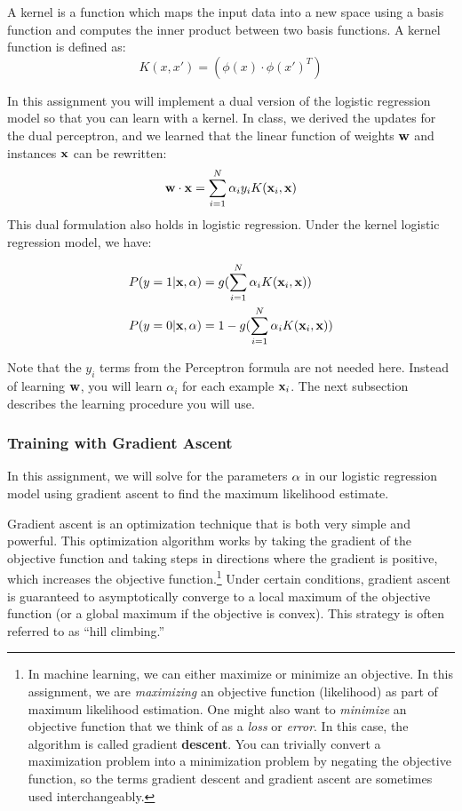 \documentclass[11pt]{article}
\newcommand{\alphai}{\alpha_i}
\newcommand{\vw}{{\bf w}}
\newcommand{\va}{{\bf \alpha}}
\newcommand{\vx}{{\bf x}}
\newcommand{\vxi}{{\bf x}_i}
\newcommand{\yi}{y_i}
\begin{document}
A kernel is a function which maps the input data into a new space using a basis function and computes the inner product between two basis functions. A kernel function is defined as:
\[
K(x, x') = (\phi(x) \cdot \phi(x')^T)
\]

In this assignment you will implement a dual version of the logistic regression model so that you can learn with a kernel. 
In class, we derived the updates for the dual perceptron, and we learned that the linear function of weights $\vw$ and instances $\vx$ can be rewritten:
\[
\vw \cdot \vx = \sum_{i=1}^N \alpha_i \yi K(\vxi, \vx)
\]
This dual formulation also holds in logistic regression. Under the kernel logistic regression model, we have:

\begin{align}
P(y=1 | \vx, \va) &  =   g(\sum_{i=1}^N \alpha_i K(\vxi, \vx)) \\
P(y=0 | \vx, \va) & =   1 - g(\sum_{i=1}^N \alpha_i K(\vxi, \vx))
\end{align}

Note that the $\yi$ terms from the Perceptron formula are not needed here.
Instead of learning $\vw$, you will learn $\alphai$ for each example $\vxi$. The next subsection describes the learning procedure you will use.

\subsubsection{Training with Gradient Ascent}

In this assignment, we will solve for the parameters $\va$ in our logistic regression model using gradient ascent to find the maximum likelihood estimate.

Gradient ascent is an optimization technique that is both very simple and powerful. This optimization algorithm works by taking the gradient of the objective function and taking steps in directions where the gradient is positive, which increases the objective function.\footnote{In machine learning, we can either maximize or minimize an objective. In this assignment, we are {\em maximizing} an objective function (likelihood) as part of maximum likelihood estimation. One might also want to {\em minimize} an objective function that we think of as a {\em loss} or {\em error}. In this case, the algorithm is called gradient {\bf descent}. You can trivially convert a maximization problem into a minimization problem by negating the objective function, so the terms gradient descent and gradient ascent are sometimes used interchangeably.}
Under certain conditions, gradient ascent is guaranteed to asymptotically converge to a local maximum of the objective function (or a global maximum if the objective is convex). This strategy is often referred to as ``hill climbing.''
\end{document}
